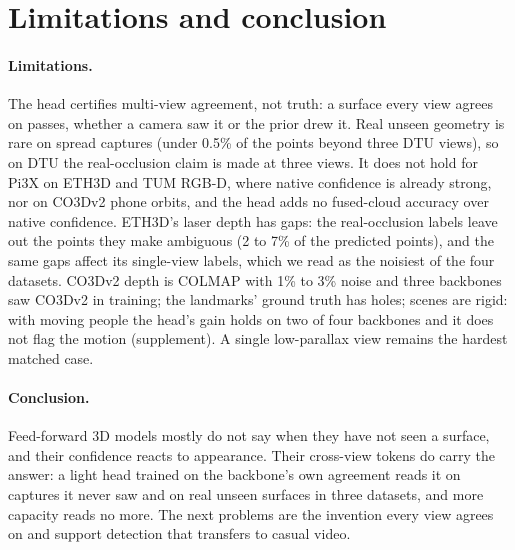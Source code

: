 \documentclass[10pt,twocolumn,letterpaper]{article}
\begin{document}

\section{Limitations and conclusion}
\label{sec:limits}

\paragraph{Limitations.}
The head certifies multi-view agreement, not truth: a surface every view agrees on passes, whether a camera saw it or the prior drew it. Real unseen geometry is rare on spread captures (under 0.5\% of the points beyond three DTU views), so on DTU the real-occlusion claim is made at three views. It does not hold for Pi3X on ETH3D and TUM RGB-D, where native confidence is already strong, nor on CO3Dv2 phone orbits, and the head adds no fused-cloud accuracy over native confidence. ETH3D's laser depth has gaps: the real-occlusion labels leave out the points they make ambiguous (2 to 7\% of the predicted points), and the same gaps affect its single-view labels, which we read as the noisiest of the four datasets. CO3Dv2 depth is COLMAP with 1\% to 3\% noise and three backbones saw CO3Dv2 in training; the landmarks' ground truth has holes; scenes are rigid: with moving people the head's gain holds on two of four backbones and it does not flag the motion (supplement). A single low-parallax view remains the hardest matched case.

\paragraph{Conclusion.} Feed-forward 3D models mostly do not say when they have not seen a surface, and their confidence reacts to appearance. Their cross-view tokens do carry the answer: a light head trained on the backbone's own agreement reads it on captures it never saw and on real unseen surfaces in three datasets, and more capacity reads no more. The next problems are the invention every view agrees on and support detection that transfers to casual video.

\end{document}
